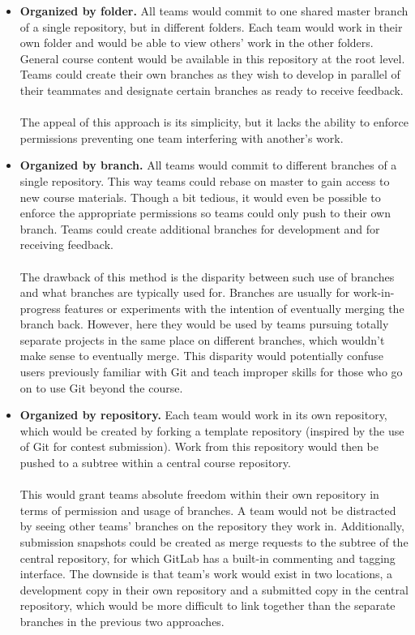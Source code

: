 \documentclass[12pt,twoside]{mitthesis}
\begin{document}
\begin{itemize}
\item \textbf{Organized by folder.} All teams would commit to one shared master branch of a single repository, but in different folders. Each team would work in their own folder and would be able to view others' work in the other folders. General course content would be available in this repository at the root level. Teams could create their own branches as they wish to develop in parallel of their teammates and designate certain branches as ready to receive feedback.\\ \\
The appeal of this approach is its simplicity, but it lacks the ability to enforce permissions preventing one team interfering with another's work.
\item \textbf{Organized by branch.} All teams would commit to different branches of a single repository. This way teams could rebase on master to gain access to new course materials. Though a bit tedious, it would even be possible to enforce the appropriate permissions so teams could only push to their own branch. Teams could create additional branches for development and for receiving feedback.\\ \\
The drawback of this method is the disparity between such use of branches and what branches are typically used for. Branches are usually for work-in-progress features or experiments with the intention of eventually merging the branch back. However, here they would be used by teams pursuing totally separate projects in the same place on different branches, which wouldn't make sense to eventually merge. This disparity would potentially confuse users previously familiar with Git and teach improper skills for those who go on to use Git beyond the course.
\item \textbf{Organized by repository.} Each team would work in its own repository, which would be created by forking a template repository (inspired by the use of Git for contest submission). Work from this repository would then be pushed to a subtree within a central course repository.\\ \\
This would grant teams absolute freedom within their own repository in terms of permission and usage of branches. A team would not be distracted by seeing other teams' branches on the repository they work in. Additionally, submission snapshots could be created as merge requests to the subtree of the central repository, for which GitLab has a built-in commenting and tagging interface. The downside is that team's work would exist in two locations, a development copy in their own repository and a submitted copy in the central repository, which would be more difficult to link together than the separate branches in the previous two approaches.
\end{itemize}
\end{document}

